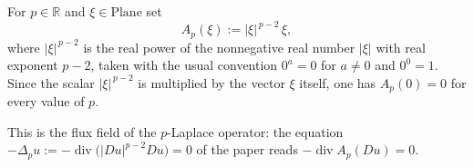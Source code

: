 \begin{definition}
For $p\in\mathbb{R}$ and $\xi\in\mathrm{Plane}$ set
\[
  A_p(\xi):=\lvert\xi\rvert^{\,p-2}\,\xi ,
\]
where $\lvert\xi\rvert^{\,p-2}$ is the real power of the nonnegative real number
$\lvert\xi\rvert$ with real exponent $p-2$, taken with the usual convention
$0^{a}=0$ for $a\neq0$ and $0^{0}=1$.  Since the scalar $\lvert\xi\rvert^{\,p-2}$ is
multiplied by the vector $\xi$ itself, one has $A_p(0)=0$ for every value of $p$.

This is the flux field of the $p$-Laplace operator: the equation
$-\Delta_pu:=-\operatorname{div}\bigl(\lvert Du\rvert^{p-2}Du\bigr)=0$ of the paper
reads $-\operatorname{div}A_p(Du)=0$.
\end{definition}
